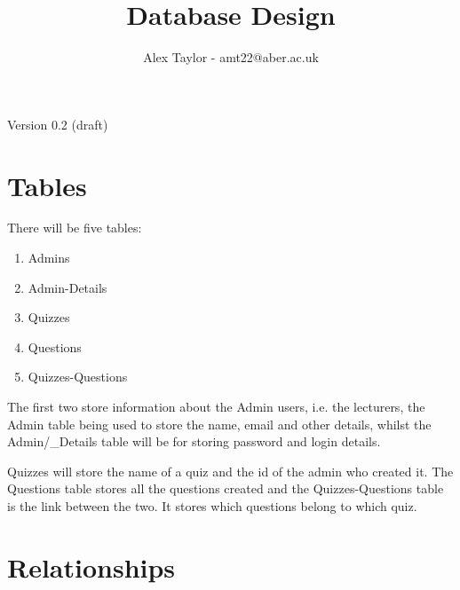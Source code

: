 \documentclass{article}
\title{Database Design}
\author{Alex Taylor - amt22@aber.ac.uk}
\begin{document}
\maketitle
\begin{center}
	Version 0.2 (draft)
\end{center}
\tableofcontents
\thispagestyle{empty}
\newpage

\section{Tables}
There will be five tables:
\begin{enumerate}
	\item Admins
	\item Admin-Details
	\item Quizzes
	\item Questions
	\item Quizzes-Questions
\end{enumerate}

The first two store information about the Admin users, i.e. the lecturers, the Admin table being used to store the name, email and other details, whilst the Admin/_Details table will be for storing password and login details.

Quizzes will store the name of a quiz and the id of the admin who created it. The Questions table stores all the questions created and the Quizzes-Questions table is the link between the two. It stores which questions belong to which quiz.

\section{Relationships}
\end{document}
